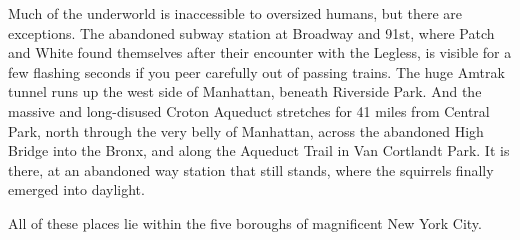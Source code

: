 \documentclass[ebook,oneside,openany,17pt]{memoir}
\newenvironment{tolerant}[1]{%
  \par\tolerance=#1\relax
}{%
  \par
}
\begin{document}
\begin{tolerant}{2000}
Much of the underworld is inaccessible to oversized humans, but there
are exceptions. The abandoned subway station at Broadway and
91st, where Patch and White found themselves after their
encounter with the Legless, is visible for a few flashing seconds if
you peer carefully out of passing trains. The huge Amtrak tunnel runs
up the west side of Manhattan, beneath Riverside Park. And the massive
and long-disused Croton Aqueduct stretches for 41 miles from Central
Park, north through the very belly of Manhattan, across the abandoned
High Bridge into the Bronx, and along the Aqueduct Trail in Van
Cortlandt Park. It is there, at an abandoned way station that still
stands, where the squirrels finally emerged into daylight.
\end{tolerant}

All of these places lie within the five boroughs of magnificent New
York City.
\end{document}

